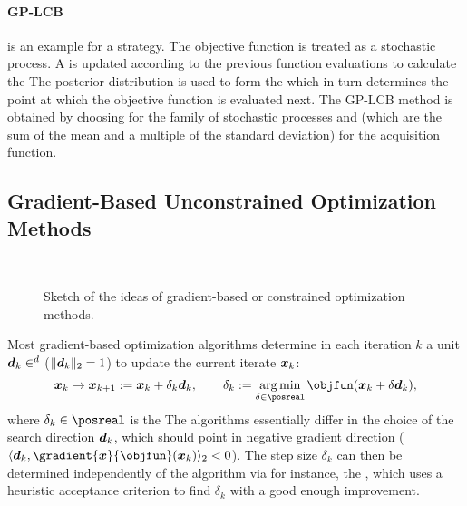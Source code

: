 \paragraph{GP-LCB}

 is an example
for a  strategy.
The objective function is treated as a stochastic process.
A  is updated according to the previous function
evaluations to calculate the 
The posterior distribution is used to form the 
which in turn determines the point at which the objective
function is evaluated next.
The GP-LCB method is obtained by choosing
 for the family of stochastic processes and
 (which are the sum of the mean
and a multiple of the standard deviation) for the acquisition function.



\subsection{Gradient-Based Unconstrained Optimization Methods}
\label{sec:512gradientBasedUnconstrained}

\begin{figure}
  \qquad{}\qquad{}%
  \\[3mm]%
  \quad{}\quad{}%
  \caption[Ideas of various gradient-based optimization methods]{%
    Sketch of the ideas of gradient-based or constrained
    optimization methods.%
  }%
  \label{fig:optimizationMethodGradientBased}%
\end{figure}

Most gradient-based optimization algorithms determine in
each iteration $k$ a unit  $\*d_k \in \real^d$
($\norm[2]{\*d_k} = 1$) to update the current iterate ${\boldsymbol{x}}_k$:
\begin{equation}
  \*x_k
  \to \*x_{k+1}
  := \*x_k + \delta_k \*d_k,\qquad
  \delta_k
  := \argmin_{\delta \in \posreal} \objfun(\*x_k + \delta \*d_k),
\end{equation}
where $\delta_k \in \posreal$ is the 
The algorithms essentially differ in the
choice of the search direction ${\boldsymbol{d}}_k$,
which should point in negative gradient
direction ($\innerprod[2]{\*d_k}{\gradient{\*x}{\objfun}(\*x_k)} < 0$).
The step size $\delta_k$ can then be determined independently of the
algorithm via 
for instance, the 
,
which uses a heuristic acceptance criterion
to find $\delta_k$ with a good enough improvement.

